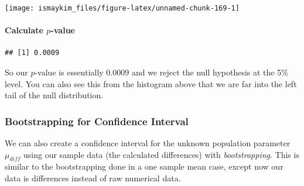 \documentclass[]{tufte-book}
\newenvironment{Shaded}{\begin{snugshade}}{\end{snugshade}}
\newcommand{\KeywordTok}[1]{\textcolor[rgb]{0.13,0.29,0.53}{\textbf{{#1}}}}
\newcommand{\DataTypeTok}[1]{\textcolor[rgb]{0.13,0.29,0.53}{{#1}}}
\newcommand{\DecValTok}[1]{\textcolor[rgb]{0.00,0.00,0.81}{{#1}}}
\newcommand{\StringTok}[1]{\textcolor[rgb]{0.31,0.60,0.02}{{#1}}}
\newcommand{\OtherTok}[1]{\textcolor[rgb]{0.56,0.35,0.01}{{#1}}}
\newcommand{\NormalTok}[1]{{#1}}
\begin{document}
\begin{center}\texttt{[image: ismaykim\_files/figure-latex/unnamed-chunk-169-1]} \end{center}

\paragraph{\texorpdfstring{Calculate
\(p\)-value}{Calculate p-value}}\label{calculate-p-value-4}

\begin{Shaded}
\end{Shaded}

\begin{verbatim}
## [1] 0.0009
\end{verbatim}

So our \(p\)-value is essentially 0.0009 and we reject the null
hypothesis at the 5\% level. You can also see this from the histogram
above that we are far into the left tail of the null distribution.

\subsubsection{Bootstrapping for Confidence
Interval}\label{bootstrapping-for-confidence-interval-4}

We can also create a confidence interval for the unknown population
parameter \(\mu_{diff}\) using our sample data (the calculated
differences) with \emph{bootstrapping}. This is similar to the
bootstrapping done in a one sample mean case, except now our data is
differences instead of raw numerical data.

\begin{Shaded}
\end{Shaded}
\end{document}
